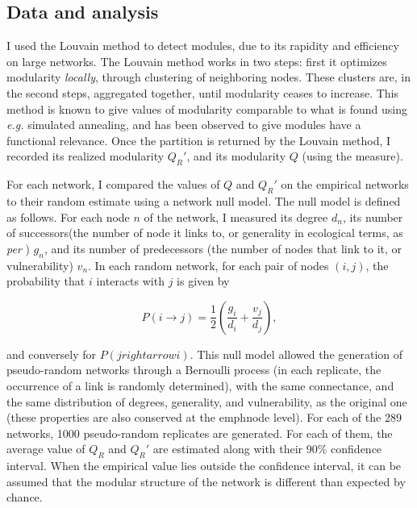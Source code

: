 \documentclass[12pt,oneside]{article}
\begin{document}
\subsection{Data and analysis}

I used the Louvain method \cite{blondel_fast_2008} to detect modules, due to
its rapidity and efficiency on large networks. The Louvain method works in two
steps: first it optimizes modularity \emph{locally}, through clustering of
neighboring nodes. These clusters are, in the second steps, aggregated
together, until modularity ceases to increase. This method is known to give
values of modularity comparable to what is found using \emph{e.g.} simulated
annealing, and has been observed to give modules have a functional relevance.
Once the partition is returned by the Louvain method, I recorded its realized
modularity $Q_R'$, and its modularity $Q$ (using the \textcite{newman_finding_2004}
measure).

For each network, I compared the values of $Q$ and $Q_R'$ on the empirical
networks to their random estimate using a network null model. The null model is
defined as follows. For each node $n$ of the network, I measured its degree
$d_n$, its number of successors(the number of node it links to, or generality
in ecological terms, as \emph{per} \cite{schoener_food_1989}) $g_n$, and its
number of predecessors (the number of nodes that link to it, or vulnerability)
$v_n$. In each random network, for each pair of nodes $(i,j)$, the probability
that $i$ interacts with $j$ is given by

\begin{equation}
	P(i\rightarrow j) = \frac{1}{2}\left(\frac{g_i}{d_i}+\frac{v_j}{d_j}\right),
	\label{e:null}
\end{equation}

\noindent and conversely for $P(jrightarrow i)$. This null model allowed the generation
of pseudo-random networks through a Bernoulli process (in each replicate, the
occurrence of a link is randomly determined), with the same connectance, and
the same distribution of degrees, generality, and vulnerability, as the
original one (these properties are also conserved at the emph{node} level).
For each of the 289 networks, 1000 pseudo-random replicates are generated. For
each of them, the average value of $Q_R$ and $Q_R'$ are estimated along with
their 90\% confidence interval. When the empirical value lies outside the
confidence interval, it can be assumed that the modular structure of the network is
different than expected by chance.
\end{document}
